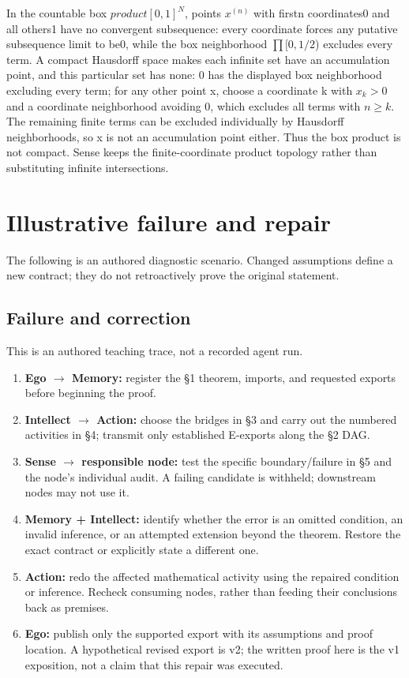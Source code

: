\documentclass[preprint,12pt,aps,pra,showkeys,amsmath,amssymb,superscriptaddress,floatfix]{revtex4-2}
\theoremstyle{definition}
\theoremstyle{remark}
\providecommand{\tightlist}{\setlength{\itemsep}{2pt}\setlength{\parskip}{0pt}}
\begin{document}
In the countable box \(product[0,1]^N\), points \(x^{(n)}\) with firstn
coordinates0 and all others1 have no convergent subsequence: every
coordinate forces any putative subsequence limit to be0, while the box
neighborhood \(\prod [0,1/2\)) excludes every term. A compact Hausdorff
space makes each infinite set have an accumulation point, and this
particular set has none: 0 has the displayed box neighborhood excluding
every term; for any other point x, choose a coordinate k with \(x_k>0\)
and a coordinate neighborhood avoiding 0, which excludes all terms with
\(n\ge k\). The remaining finite terms can be excluded individually by
Hausdorff neighborhoods, so x is not an accumulation point either. Thus
the box product is not compact. Sense keeps the finite-coordinate
product topology rather than substituting infinite intersections.

\section{Illustrative failure and repair}

The following is an authored diagnostic scenario. Changed assumptions
define a new contract; they do not retroactively prove the original
statement.

\subsection{Failure and correction}
This is an authored teaching trace, not a recorded agent run.

\begin{enumerate}
\def\labelenumi{\arabic{enumi}.}
\tightlist
\item
  \textbf{Ego \(\to\) Memory:} register the §1 theorem, imports, and
  requested exports before beginning the proof.
\item
  \textbf{Intellect \(\to\) Action:} choose the bridges in §3 and carry
  out the numbered activities in §4; transmit only established E-exports
  along the §2 DAG.
\item
  \textbf{Sense \(\to\) responsible node:} test the specific
  boundary/failure in §5 and the node's individual audit. A failing
  candidate is withheld; downstream nodes may not use it.
\item
  \textbf{Memory + Intellect:} identify whether the error is an omitted
  condition, an invalid inference, or an attempted extension beyond the
  theorem. Restore the exact contract or explicitly state a different
  one.
\item
  \textbf{Action:} redo the affected mathematical activity using the
  repaired condition or inference. Recheck consuming nodes, rather than
  feeding their conclusions back as premises.
\item
  \textbf{Ego:} publish only the supported export with its assumptions
  and proof location. A hypothetical revised export is v2; the written
  proof here is the v1 exposition, not a claim that this repair was
  executed.
\end{enumerate}
\end{document}
